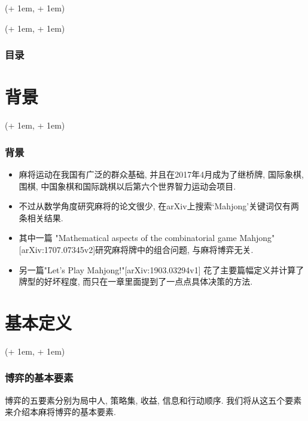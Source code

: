 \documentclass[xcolor=dvipsnames]{ctexbeamer}
\title{\TITLE}
\author{\AUTHOR}
\date{\tdyear\dateseparator\tdmonth\dateseparator\tdday\hspace{1em}\tdtime}
\institute{\INSTITUTE}
\newcommand{\FrameTextSE}[1]{
    \begin{textblock*}{\paperwidth}(\textwidth + 1em, \textheight + 1em)
        #1
    \end{textblock*}
}
\let\oldframe\frame
\let\oldendframe\endframe
\renewenvironment{frame}
    {\oldframe\FrameTextSE{\small\color{blue}{\crono}}}
    {\oldendframe}
\begin{document}

    \begin{frame}
        \initclock
        \titlepage
    \end{frame}
    
    
    \begin{frame}
        \frametitle{目录}
        \tableofcontents
    \end{frame}

    
    \section{背景}

    \begin{frame}
        \frametitle{背景}
        \begin{itemize}
            \item 麻将运动在我国有广泛的群众基础, 并且在2017年4月成为了继桥牌,
                国际象棋, 围棋, 中国象棋和国际跳棋以后第六个世界智力运动会项目.
            \item 不过从数学角度研究麻将的论文很少,
                在arXiv上搜索`Mahjong'关键词仅有两条相关结果.
            \item 其中一篇
                "Mathematical aspects of the combinatorial game Mahjong"
                [arXiv:1707.07345v2]研究麻将牌中的组合问题,
                与麻将博弈无关.
            \item 另一篇"Let's Play Mahjong!"[arXiv:1903.03294v1]
                花了主要篇幅定义并计算了牌型的好坏程度,
                而只在一章里面提到了一点点具体决策的方法.
        \end{itemize}
    \end{frame}

    \section{基本定义}

    \begin{frame}
        \frametitle{博弈的基本要素}
        博弈的五要素分别为局中人, 策略集, 收益, 信息和行动顺序.
        我们将从这五个要素来介绍本麻将博弈的基本要素.
    \end{frame}
\end{document}
